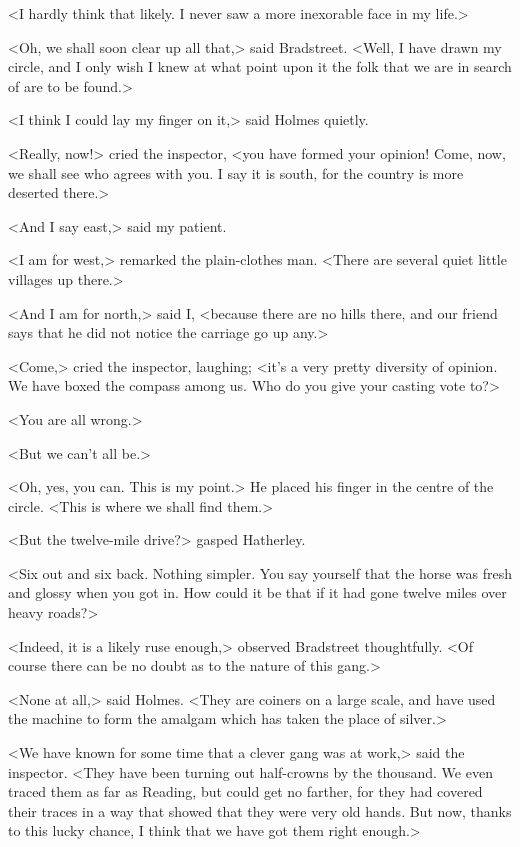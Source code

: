 <I hardly think that likely. I never saw a more inexorable face in my life.>

<Oh, we shall soon clear up all that,> said Bradstreet. <Well, I have drawn my circle, and I only wish I knew at what point upon it the folk that we are in search of are to be found.>

<I think I could lay my finger on it,> said Holmes quietly.

<Really, now!> cried the inspector, <you have formed your opinion! Come, now, we shall see who agrees with you. I say it is south, for the country is more deserted there.>

<And I say east,> said my patient.

<I am for west,> remarked the plain-clothes man. <There are several quiet little villages up there.>

<And I am for north,> said I, <because there are no hills there, and our friend says that he did not notice the carriage go up any.>

<Come,> cried the inspector, laughing; <it's a very pretty diversity of opinion. We have boxed the compass among us. Who do you give your casting vote to?>

<You are all wrong.>

<But we can't all be.>

<Oh, yes, you can. This is my point.> He placed his finger in the centre of the circle. <This is where we shall find them.>

<But the twelve-mile drive?> gasped Hatherley.

<Six out and six back. Nothing simpler. You say yourself that the horse was fresh and glossy when you got in. How could it be that if it had gone twelve miles over heavy roads?>

<Indeed, it is a likely ruse enough,> observed Bradstreet thoughtfully. <Of course there can be no doubt as to the nature of this gang.>

<None at all,> said Holmes. <They are coiners on a large scale, and have used the machine to form the amalgam which has taken the place of silver.>

<We have known for some time that a clever gang was at work,> said the inspector. <They have been turning out half-crowns by the thousand. We even traced them as far as Reading, but could get no farther, for they had covered their traces in a way that showed that they were very old hands. But now, thanks to this lucky chance, I think that we have got them right enough.>

